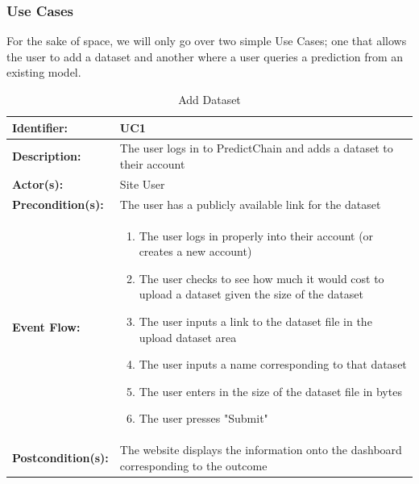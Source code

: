 \documentclass{article}
\begin{document}
    \subsubsection*{Use Cases}
    For the sake of space, we will only go over two simple Use Cases; one that allows the user to add a dataset and
    another where a user queries a prediction from an existing model.

    \begin{table}[H]
        \caption{Add Dataset}
        \label{tab:add-ds}
        \centering
        \begin{tabular}{|p{3cm}|p{8cm}|}
            \hline
            \textbf{Identifier:} & UC1 \\
            \hline
            \textbf{Description:} & The user logs in to PredictChain and adds a dataset to their account\\
            \hline
            \textbf{Actor(s):} & Site User \\
            \hline
            \textbf{Precondition(s):} & The user has a publicly available link for the dataset\\
            \hline
            \textbf{Event Flow:} &
            \begin{enumerate}
                \item The user logs in properly into their account (or creates a new account)
                \item The user checks to see how much it would cost to upload a dataset given the size of the dataset
                \item The user inputs a link to the dataset file in the upload dataset area
                \item The user inputs a name corresponding to that dataset
                \item The user enters in the size of the dataset file in bytes
                \item The user presses "Submit"
            \end{enumerate} \\
            \hline
            \textbf{Postcondition(s):} & The website displays the information onto the dashboard corresponding to the outcome \\
            \hline
        \end{tabular}
    \end{table}
\end{document}
